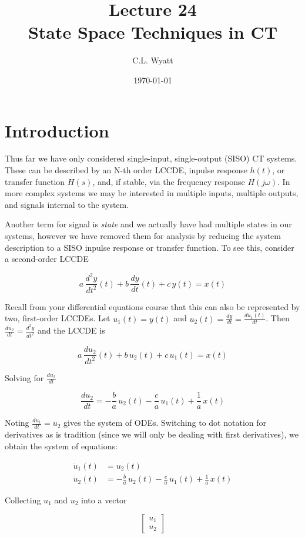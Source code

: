 \documentclass{article}
\begin{document}
\title{Lecture 24\\State Space Techniques in CT}
\author{C.L. Wyatt}
\date{\today}
\maketitle

\section{Introduction}

Thus far we have only considered single-input, single-output (SISO) CT systems. These can be described by an N-th order LCCDE, inpulse response $h(t)$, or transfer function $H(s)$, and, if stable, via the frequency response $H(j\omega)$. In more complex systems we may be interested in multiple inputs, multiple outputs, and signals internal to the system.

Another term for signal is \textit{state} and we actually have had multiple states in our systems, however we have removed them for analysis by reducing the system description to a SISO inpulse response or transfer function. To see this, consider a second-order LCCDE

\[
a\, \frac{d^2y}{dt^2}(t) + b\,\frac{dy}{dt}(t) + c\, y(t) = x(t)
\]

Recall from your differential equations course that this can also be represented by two, first-order LCCDEs. Let $u_1(t) = y(t)$ and $u_2(t) = \frac{dy}{dt} = \frac{du_1(t)}{dt}$. Then $\frac{du_2}{dt} = \frac{d^2y}{dt^2}$ and the LCCDE is

\[
a\, \frac{du_2}{dt^2}(t) + b\,u_2(t) + c\, u_1(t) = x(t)
\]

Solving for $\frac{du_2}{dt}$

\[
\frac{du_2}{dt} = -\frac{b}{a}\, u_2(t) - \frac{c}{a}\, u_1(t) + \frac{1}{a}\, x(t)
\]

Noting $\frac{du_1}{dt} = u_2$ gives the system of ODEs. Switching to dot notation for derivatives as is tradition (since we will only be dealing with first derivatives), we obtain the system of equations:

\begin{align*}
  \dot{u}_1 (t) &= u_2(t) \\
  \dot{u}_2 (t) &= -\frac{b}{a}\, u_2(t) - \frac{c}{a}\, u_1(t) + \frac{1}{a}\, x(t)
\end{align*}

Collecting $u_1$ and $u_2$ into a vector

\[
\left[ \begin{array}{c}
  u_1 \\
  u_2
\end{array}\right]
\]
\end{document}
